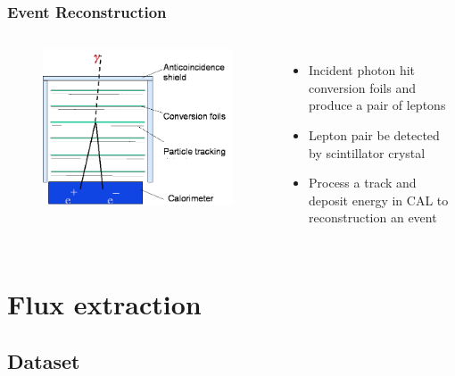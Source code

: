\documentclass{beamer}
\begin{document}
\begin{frame}
  \frametitle{Event Reconstruction}
  \begin{columns}
  
    \centering
    \begin{figure}[h!]
    \includegraphics[width = \textwidth]{img/LATMethodology}
    \end{figure}
  
    \begin{itemize}
    \item Incident photon hit conversion foils and produce a pair of leptons
    \item Lepton pair be detected by scintillator crystal
    \item Process a track and deposit energy in CAL to reconstruction an event
    \end{itemize}
  \end{columns}
\end{frame}

\section{Flux extraction}
\subsection{Dataset}
\end{document}
